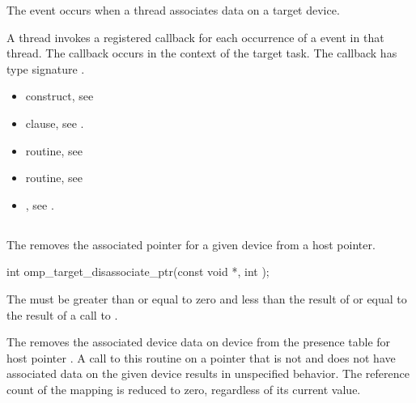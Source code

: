\begin{ccppspecific}
\events
The  event occurs when a thread associates data on a target device.

\tools

A thread invokes a registered 
callback for each occurrence of a  event in that thread.
The callback occurs in the context of the target task.  The callback has type signature
.

\crossreferences
\begin{itemize}
\item {} construct, see 

\item {} clause, see .

\item {} routine, see 

\item {} routine, see

\item {}, see
.

\end{itemize}

\subsection{}
\label{subsec:omp_target_disassociate_ptr}
\summary

The  removes the associated pointer for a
given device from a host pointer.

\format
\begin{ompcFunction}
int omp_target_disassociate_ptr(const void *, int );
\end{ompcFunction}

\constraints


The 
must be greater than or equal to zero and less than the result of
 or equal to the result of a call to
.

\effect

The  removes the associated device data
on device  from the presence table for host pointer
. A call to this routine on a pointer that is not
 and does not have associated data on the given device results
in unspecified behavior.  The reference count of the mapping is reduced to
zero, regardless of its current value.


\end{ccppspecific}
